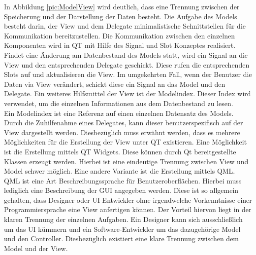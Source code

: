 In Abbildung \ref{pic:ModelView} wird deutlich, dass eine Trennung zwischen der Speicherung und der Darstellung der Daten besteht. Die Aufgabe des Models besteht darin, der View und dem Delegate minimalistische Schnittstellen für die Kommunikation bereitzustellen. Die Kommunikation zwischen den einzelnen Komponenten wird in QT mit Hilfe des Signal und Slot Konzeptes realisiert. Findet eine Änderung am Datenbestand des Models statt, wird ein Signal an die View und den entsprechenden Delegate geschickt. Diese rufen die entsprechenden Slots auf und aktualisieren die View. Im umgekehrten Fall, wenn der Benutzer die Daten via View verändert, schickt diese ein Signal an das Model und den Delegate. Ein weiteres Hilfsmittel der View ist der Modelindex. Dieser Index wird verwendet, um die einzelnen Informationen aus dem Datenbestand zu lesen. \\

Ein Modelindex ist eine Referenz auf einen einzelnen Datensatz des Models. Durch die Zuhilfenahme eines Delegates, kann dieser benutzerspezifisch auf der View dargestellt werden. Diesbezüglich muss erwähnt werden, dass es mehrere Möglichkeiten für die Erstellung der View unter QT existieren. Eine Möglichkeit ist die Erstellung mittels QT Widgets. Diese können durch Qt bereitgestellte Klassen erzeugt werden. Hierbei ist eine eindeutige Trennung zwischen View und Model schwer möglich. Eine andere Variante ist die Erstellung mittels QML. QML ist eine Art Beschreibungssprache für Benutzeroberflächen. Hierbei muss lediglich eine Beschreibung der GUI angegeben werden. Diese ist so allgemein gehalten, dass Designer oder UI-Entwickler ohne irgendwelche Vorkenntnisse einer Programmiersprache eine View anfertigen können. Der Vorteil hiervon liegt in der klaren Trennung der einzelnen Aufgaben. Ein Designer kann sich ausschließlich um das UI kümmern und ein Software-Entwickler um das dazugehörige Model und den Controller. Diesbezüglich existiert eine klare Trennung zwischen dem Model und der View.\\

